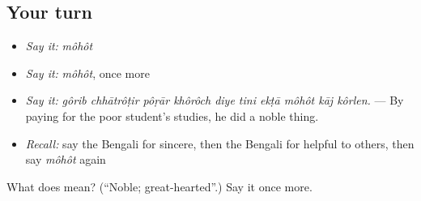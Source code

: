 \subsection*{Your turn}
\begin{itemize}
\raggedright
  \item \emph{Say it:} \emph{môhôt}
  \item \emph{Say it:} \emph{môhôt}, once more
  \item \emph{Say it:} \emph{gôrib chhātrôṭir pôṛār khôrôch diye tini ekṭā môhôt kāj kôrlen.} — By paying for the poor student's studies, he did a noble thing.
  \item \emph{Recall:} say the Bengali for sincere, then the Bengali for helpful to others, then say \emph{môhôt} again
\end{itemize}

\begin{tcolorbox}[breakable,colback=teal!4,colframe=teal!35!black,title={Before you move on}]
What does  mean? (\textquotedblleft{}Noble; great-hearted\textquotedblright{}.) Say it once more.
\end{tcolorbox}

